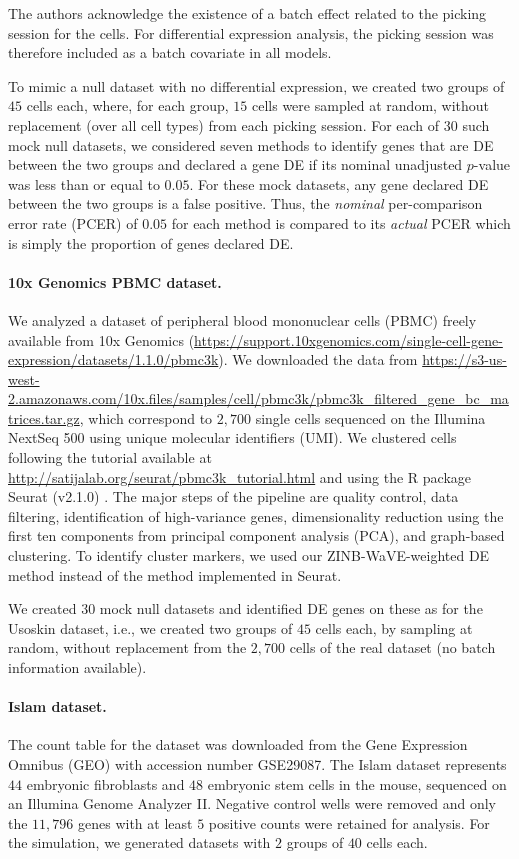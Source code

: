 \documentclass{bmcart}
\newcommand{\RPack}[1]{\textsf{#1}}
\begin{document}
The authors acknowledge the existence of a batch effect related to the picking session for the cells. For differential expression analysis, the picking session was therefore included as a batch covariate in all models. 

To mimic a null dataset with no differential expression, we created two groups of $45$ cells each, where, for each group, $15$ cells were sampled at random, without replacement (over all cell types) from each picking session. For each of $30$ such mock null datasets, we considered seven methods to identify genes that are DE between the two groups and declared a gene DE if its nominal unadjusted $p$-value was less than or equal to $0.05$. For these mock datasets, any gene declared DE between the two groups is a false positive. Thus, the \textit{nominal} per-comparison error rate (PCER) of $0.05$ for each method is compared to its \textit{actual} PCER which is simply the proportion of genes declared DE.

\paragraph{10x Genomics PBMC dataset.} 
We analyzed a dataset of peripheral blood mononuclear cells (PBMC) freely available from 10x Genomics (\url{https://support.10xgenomics.com/single-cell-gene-expression/datasets/1.1.0/pbmc3k}). We downloaded the data from \url{https://s3-us-west-2.amazonaws.com/10x.files/samples/cell/pbmc3k/pbmc3k_filtered_gene_bc_matrices.tar.gz}, which correspond to $2,700$ single cells sequenced on the Illumina NextSeq 500 using unique molecular identifiers (UMI).
We clustered cells following the tutorial available at 
\url{http://satijalab.org/seurat/pbmc3k_tutorial.html} and using the R package \RPack{Seurat} (v2.1.0) \citep{Butler2017}. The major steps of the pipeline are quality control, data filtering, identification of high-variance genes, dimensionality reduction using the first ten components from principal component analysis (PCA), and graph-based clustering. 
To identify cluster markers, we used our ZINB-WaVE-weighted DE method instead of the method implemented in \RPack{Seurat}. 

We created $30$ mock null datasets and identified DE genes on these as for the Usoskin dataset, i.e., we created two groups of $45$ cells each, by sampling at random, without replacement from the $2,700$ cells of the real dataset (no batch information available). 

\paragraph{Islam dataset.} 
The count table for the \citet{Islam2011} dataset was downloaded from the Gene Expression Omnibus (GEO) with accession number GSE29087. The Islam dataset represents $44$ embryonic fibroblasts and $48$ embryonic stem cells in the mouse, sequenced on an Illumina Genome Analyzer II. Negative control wells were removed and only the $11,796$ genes with at least $5$ positive counts were retained for analysis. For the simulation, we generated datasets with $2$ groups of $40$ cells each.
\end{document}

